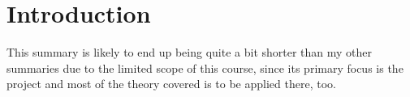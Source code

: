 \section{Introduction}
This summary is likely to end up being quite a bit shorter than my other summaries due to the limited scope of this course,
since its primary focus is the project and most of the theory covered is to be applied there, too.
